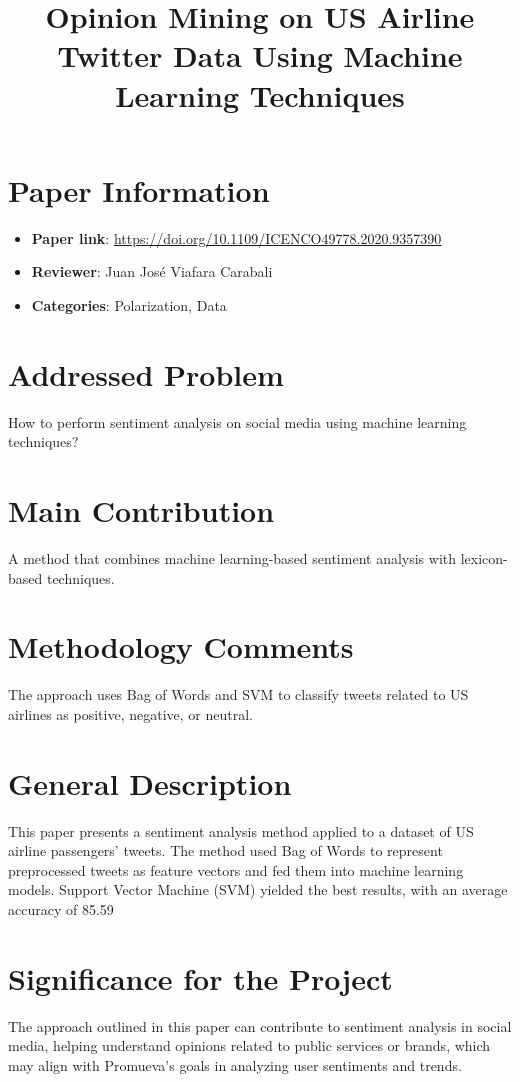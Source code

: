 \documentclass{article}
\title{Opinion Mining on US Airline Twitter Data Using Machine Learning Techniques}
\author{}
\date{}
\begin{document}
\maketitle

\section*{Paper Information}
\begin{itemize}
    \item \textbf{Paper link}: \url{https://doi.org/10.1109/ICENCO49778.2020.9357390}
    \item \textbf{Reviewer}: Juan José Viafara Carabali
    \item \textbf{Categories}: Polarization, Data
\end{itemize}

\section*{Addressed Problem}
How to perform sentiment analysis on social media using machine learning techniques?

\section*{Main Contribution}
A method that combines machine learning-based sentiment analysis with lexicon-based techniques.

\section*{Methodology Comments}
The approach uses Bag of Words and SVM to classify tweets related to US airlines as positive, negative, or neutral.

\section*{General Description}
This paper presents a sentiment analysis method applied to a dataset of US airline passengers’ tweets. The method used Bag of Words to represent preprocessed tweets as feature vectors and fed them into machine learning models. Support Vector Machine (SVM) yielded the best results, with an average accuracy of 85.59%

\section*{Significance for the Project}
The approach outlined in this paper can contribute to sentiment analysis in social media, helping understand opinions related to public services or brands, which may align with Promueva’s goals in analyzing user sentiments and trends.
\end{document}
